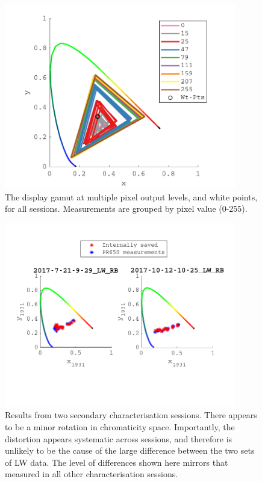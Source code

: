 \begin{figure}[htbp]
\includegraphics[max width=0.9\textwidth,center]{figs/SmallSphere/SSgamut.pdf}
\caption{The display gamut at multiple pixel output levels, and white points, for all sessions. Measurements are grouped by pixel value (0-255).}
\label{fig:SSgamut}
\end{figure}

\begin{figure}[htbp]
\includegraphics[max width=0.9\textwidth,center]{figs/SmallSphere/SSseccal2.pdf}
\caption{Results from two secondary characterisation sessions. There appears to be a minor rotation in chromaticity space. Importantly, the distortion appears systematic across sessions, and therefore is unlikely to be the cause of the large difference between the two sets of LW data. The level of differences shown here mirrors that measured in all other characterisation sessions.}
\label{fig:SScal2}
\end{figure}

